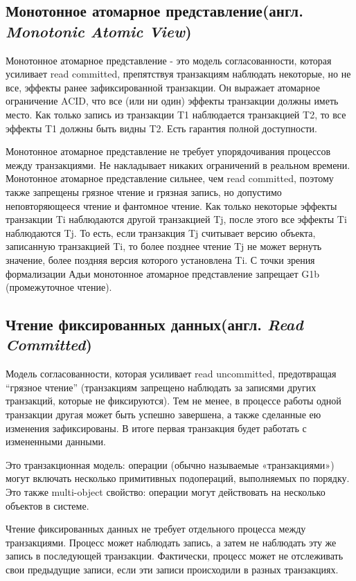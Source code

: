 \documentclass[12pt,  openany]{book}
\begin{document}
\subsection{Монотонное атомарное представление(англ.  \textit{Monotonic Atomic View})}
Монотонное атомарное представление - это модель согласованности, которая усиливает read committed, препятствуя транзакциям наблюдать некоторые, но не все, эффекты ранее зафиксированной транзакции. Он выражает атомарное ограничение ACID, что все (или ни один) эффекты транзакции должны иметь место. Как только запись из транзакции T1 наблюдается транзакцией T2, то все эффекты T1 должны быть видны T2. 
Есть гарантия полной доступности.
\par
Монотонное атомарное представление не требует упорядочивания процессов между транзакциями. Не накладывает никаких ограничений в реальном времени.
Монотонное атомарное представление сильнее, чем  read committed, поэтому также запрещены грязное чтение и грязная запись, но допустимо неповторяющееся чтение и фантомное чтение.
Как только некоторые эффекты транзакции Ti наблюдаются другой транзакцией Tj, после этого все эффекты Ti наблюдаются Tj. То есть, если транзакция Tj считывает версию объекта, записанную транзакцией Ti, то более позднее чтение Tj не может вернуть значение, более поздняя версия которого установлена Ti.
С точки зрения формализации Адьи монотонное атомарное представление запрещает G1b (промежуточное чтение).

\subsection{Чтение фиксированных данных(англ.  \textit{Read Committed})}
Модель согласованности, которая усиливает read uncommitted, предотвращая “грязное чтение” (транзакциям запрещено наблюдать за записями других транзакций, которые не фиксируются). Тем не менее, в процессе работы одной транзакции другая может быть успешно завершена, а также сделанные ею изменения зафиксированы. В итоге первая транзакция будет работать с  измененными данными.
\par
Это транзакционная модель: операции (обычно называемые «транзакциями») могут включать несколько примитивных подопераций, выполняемых по порядку. Это также multi-object свойство: операции могут действовать на несколько объектов в системе.
\par
Чтение фиксированных данных не требует отдельного процесса между транзакциями. Процесс может наблюдать запись, а затем не наблюдать эту же запись в последующей транзакции. Фактически, процесс может не отслеживать свои предыдущие записи, если эти записи происходили в разных транзакциях.
\end{document}
